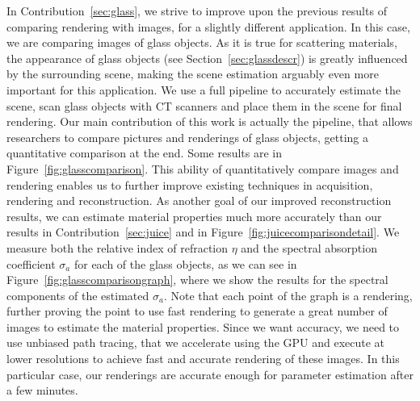 In Contribution~\ref{sec:glass}, we strive to improve upon the previous results of comparing rendering with images, for a slightly different application. In this case, we are comparing images of glass objects. As it is true for scattering materials, the appearance of glass objects (see Section~\ref{sec:glassdescr}) is greatly influenced by the surrounding scene, making the scene estimation arguably even more important for this application. We use a full pipeline to accurately estimate the scene, scan glass objects with CT scanners and place them in the scene for final rendering. Our main contribution of this work is actually the pipeline, that allows researchers to compare pictures and renderings of glass objects, getting a quantitative comparison at the end. Some results are in Figure~\ref{fig:glasscomparison}. This ability of quantitatively compare images and rendering enables us to further improve existing techniques in acquisition, rendering and reconstruction. As another goal of our improved reconstruction results, we can estimate material properties much more accurately than our  results in Contribution~\ref{sec:juice} and in Figure~\ref{fig:juicecomparisondetail}. We measure both the relative index of refraction $\eta$ and the spectral absorption coefficient $\sigma_a$ for each of the glass objects, as we can see in Figure~\ref{fig:glasscomparisongraph}, where we show the results for the spectral components of the estimated $\sigma_a$. Note that each point of the graph is a rendering, further proving the point to use fast rendering to generate a great number of images to estimate the material properties. Since we want accuracy, we need to use unbiased path tracing, that we accelerate using the GPU and execute at lower resolutions to achieve fast and accurate rendering of these images. In this particular case, our renderings are accurate enough for parameter estimation after a few minutes. 

